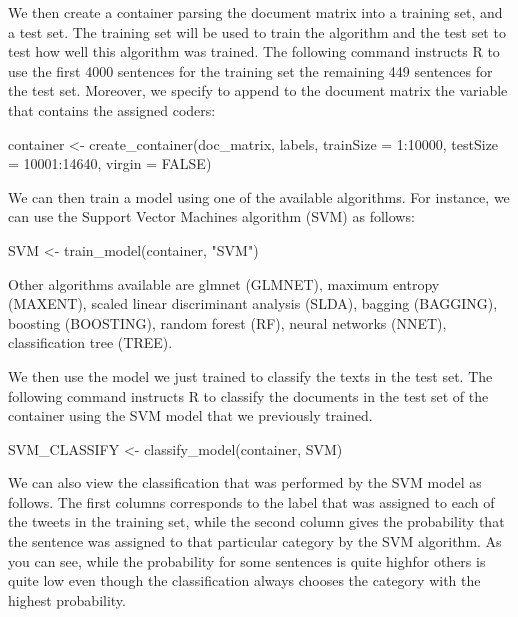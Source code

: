 \documentclass[
]{book}
\newenvironment{Shaded}{\begin{snugshade}}{\end{snugshade}}
\newcommand{\AttributeTok}[1]{\textcolor[rgb]{0.77,0.63,0.00}{#1}}
\newcommand{\ConstantTok}[1]{\textcolor[rgb]{0.00,0.00,0.00}{#1}}
\newcommand{\DecValTok}[1]{\textcolor[rgb]{0.00,0.00,0.81}{#1}}
\newcommand{\FunctionTok}[1]{\textcolor[rgb]{0.00,0.00,0.00}{#1}}
\newcommand{\NormalTok}[1]{#1}
\newcommand{\OtherTok}[1]{\textcolor[rgb]{0.56,0.35,0.01}{#1}}
\newcommand{\SpecialCharTok}[1]{\textcolor[rgb]{0.00,0.00,0.00}{#1}}
\newcommand{\StringTok}[1]{\textcolor[rgb]{0.31,0.60,0.02}{#1}}
\begin{document}
We then create a container parsing the document matrix into a training set, and a test set. The training set will be used to train the algorithm and the test set to test how well this algorithm was trained. The following command instructs R to use the first 4000 sentences for the training set the remaining 449 sentences for the test set. Moreover, we specify to append to the document matrix the variable that contains the assigned coders:

\begin{Shaded}
\begin{Highlighting}[]
\NormalTok{container }\OtherTok{\textless{}{-}} \FunctionTok{create\_container}\NormalTok{(doc\_matrix, labels, }\AttributeTok{trainSize =} \DecValTok{1}\SpecialCharTok{:}\DecValTok{10000}\NormalTok{, }\AttributeTok{testSize =} \DecValTok{10001}\SpecialCharTok{:}\DecValTok{14640}\NormalTok{, }\AttributeTok{virgin =} \ConstantTok{FALSE}\NormalTok{)}
\end{Highlighting}
\end{Shaded}

We can then train a model using one of the available algorithms. For instance, we can use the Support Vector Machines algorithm (SVM) as follows:

\begin{Shaded}
\begin{Highlighting}[]
\NormalTok{SVM }\OtherTok{\textless{}{-}} \FunctionTok{train\_model}\NormalTok{(container, }\StringTok{"SVM"}\NormalTok{)}
\end{Highlighting}
\end{Shaded}

Other algorithms available are glmnet (GLMNET), maximum entropy (MAXENT), scaled linear discriminant analysis (SLDA), bagging (BAGGING), boosting (BOOSTING), random forest (RF), neural networks (NNET), classification tree (TREE).

We then use the model we just trained to classify the texts in the test set. The following command instructs R to classify the documents in the test set of the container using the SVM model that we previously trained.

\begin{Shaded}
\begin{Highlighting}[]
\NormalTok{SVM\_CLASSIFY }\OtherTok{\textless{}{-}} \FunctionTok{classify\_model}\NormalTok{(container, SVM)}
\end{Highlighting}
\end{Shaded}

We can also view the classification that was performed by the SVM model as follows. The first columns corresponds to the label that was assigned to each of the tweets in the training set, while the second column gives the probability that the sentence was assigned to that particular category by the SVM algorithm. As you can see, while the probability for some sentences is quite highfor others is quite low even though the classification always chooses the category with the highest probability.
\end{document}

